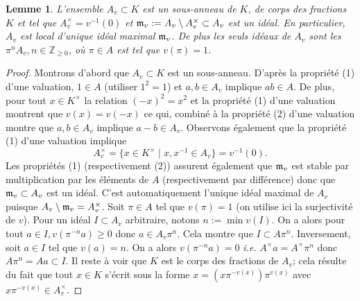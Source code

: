 \documentclass[a4paper, oneside, 12pt]{book}
\newtheorem{lemme}[theoreme]{Lemme}
\theoremstyle{definition} %
\newcommand{\ie}{\textit{i.e.}} %
\newcommand{\Z}{\mathbb{Z}}
\begin{document}
\begin{lemme}\label{AVD}
  L'ensemble $A_v \subset K$ est un sous-anneau de $K$, de corps des fractions $K$ et tel que $A_v^\times=v^{-1}(0)$ et $\frak{m}_v:= A_v\setminus A_v^\times \subset A_v$ est un idéal. En particulier, $A_v$ est local d'unique idéal maximal $\frak{m}_v$. De plus les seuls idéaux de $A_v$ sont les $\pi^nA_v, n\in\Z_{\geq 0}$, où $\pi\in A$ est tel que $v(\pi)=1$.
\end{lemme}

\begin{proof} Montrons d'abord que $A_v\subset K$ est un sous-anneau. D'après la propriété (1) d'une valuation, $1\in A$ (utiliser $1^2=1$) et $a,b\in A_v$ implique $ab\in A$. De plus, pour tout $x\in K^\times$  la relation $(-x)^2=x^2$ et la propriété (1) d'une valuation montrent que $v(x)=v(-x)$ ce qui, combiné à la propriété (2) d'une valuation montre que $a,b\in A_v$ implique $a-b\in A_v$. Observons également que la propriété (1) d'une valuation implique $$A_v^\times=\{x\in K^\times\;|\; x,x^{-1}\in A_v\} = v^{-1}(0).$$ 
  Les propriétés (1) (respectivement (2)) assurent également que $\frak{m}_v$ est stable par multiplication par les éléments de $A$ (respectivement par différence) donc que $\frak{m}_v\subset A_v$ est un idéal. C'est automatiquement l'unique idéal maximal de $A_v$ puisque $A_v\setminus \frak{m}_v=A_v^\times$. 
  Soit $\pi\in A$ tel que $v(\pi)=1$ (on utilise ici la surjectivité de $v$). Pour un idéal $I\subset A_v$ arbitraire, notons $n:=\min{v(I)}$. On a alors pour tout $a\in I, v(\pi^{-n}a)\geq 0$ donc $a\in A_v\pi^n$. Cela montre que $I\subset A\pi^n$. Inversement, soit $a\in I$ tel que $v(a)=n$. On a alors $v(\pi^{-n}a)=0$ \ie{} $A^\times a=A^\times \pi^n$ donc $A\pi^n=Aa\subset I$. Il reste à voir que $K$ est le corps des fractions de $A_v$; cela résulte du fait que tout $x\in K$ s'écrit sous la forme $x=(x\pi^{-v(x)})\pi^{v(x)}$ avec $ x\pi^{-v(x)}\in A_v^\times$. %
\end{proof}
 
\end{document}
